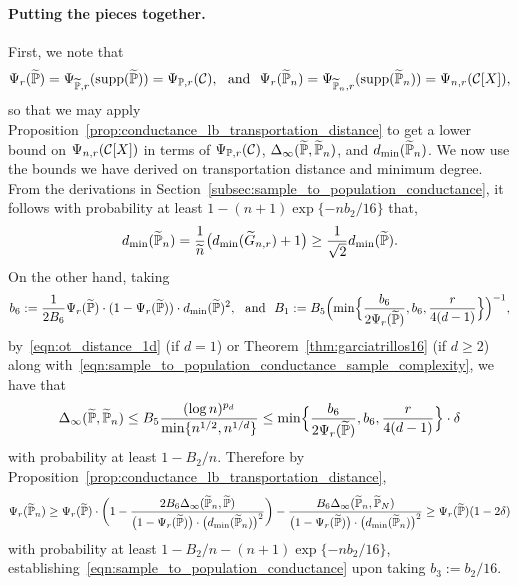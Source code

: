 \paragraph{Putting the pieces together.} 
First, we note that
\begin{equation*}
\Psi_r(\widetilde{\mathbb{P}}) = \Psi_{\widetilde{\mathbb{P}},r}(\mathrm{supp}(\widetilde{\mathbb{P}})) = \Psi_{\mathbb{P},r}(\mathcal{C}), ~~\textrm{and}~~\Psi_{r}(\widetilde{\mathbb{P}}_n) = \Psi_{\widetilde{\mathbb{P}}_n, r}(\mathrm{supp}(\widetilde{\mathbb{P}}_n)) = \Psi_{n,r}(\mathcal{C}[X]),
\end{equation*}
so that we may apply Proposition~\ref{prop:conductance_lb_transportation_distance} to get a lower bound on $\Psi_{n,r}(\mathcal{C}[X])$ in terms of $\Psi_{\mathbb{P},r}(\mathcal{C})$, $\Delta_{\infty}(\widetilde{\mathbb{P}}, \widetilde{\mathbb{P}}_n)$, and $d_{\min}(\widetilde{\mathbb{P}}_{n})$. We now use the bounds we have derived on transportation distance and minimum degree. From the derivations in Section~\ref{subsec:sample_to_population_conductance}, it follows with probability at least $1 - (n + 1)\exp\{-nb_2/16\}$ that,
\begin{equation*}
d_{\min}(\widetilde{\mathbb{P}}_n) = \frac{1}{\widetilde{n}} \bigl(d_{\min}(\widetilde{G}_{n,r}) + 1\bigr) \geq \frac{1}{\sqrt{2}} d_{\min}(\widetilde{\mathbb{P}}).
\end{equation*}
On the other hand, taking
\begin{equation*}
b_6 := \frac{1}{2B_6}\Psi_r(\widetilde{\mathbb{P}}) \cdot (1 - \Psi_r(\widetilde{\mathbb{P}})) \cdot d_{\min}(\widetilde{\mathbb{P}})^2,~~\textrm{and}~~ B_1 := B_5 \Bigl(\min\Bigl\{\frac{b_6}{2\Psi_r(\widetilde{\mathbb{P}})}, b_6, \frac{r}{4(d - 1)} \Bigr\}\Bigr)^{-1},
\end{equation*}
by~\eqref{eqn:ot_distance_1d} (if $d = 1$) or Theorem~\ref{thm:garciatrillos16} (if $d \geq 2$) along with~\eqref{eqn:sample_to_population_conductance_sample_complexity}, we have that
\begin{equation*}
\Delta_{\infty}(\widetilde{\mathbb{P}},\widetilde{\mathbb{P}}_n) \leq B_5 \frac{(\log n)^{p_d}}{\min\{n^{1/2},n^{1/d}\}} \leq \min\Bigl\{\frac{b_6}{2\Psi_r(\widetilde{\mathbb{P}})}, b_6, \frac{r}{4(d - 1)} \Bigr\} \cdot \delta
\end{equation*}
with probability at least $1 - B_2/n$. Therefore by Proposition~\ref{prop:conductance_lb_transportation_distance},
\begin{equation*}
\Psi_r(\widetilde{\mathbb{P}}_n) \geq \Psi_r(\widetilde{\mathbb{P}}) \cdot \biggl(1 - \frac{2B_6\Delta_{\infty}(\widetilde{\mathbb{P}}_n,\widetilde{\mathbb{P}})}{\bigl(1 - \Psi_r(\widetilde{\mathbb{P}})\bigr) \cdot \bigl(d_{\min}(\widetilde{\mathbb{P}}_n)\bigr)^2}\biggr) - \frac{B_6 \Delta_{\infty}(\widetilde{\mathbb{P}}_n,\widetilde{\mathbb{P}}_N)}{\bigl(1 - \Psi_r(\widetilde{\mathbb{P}})\bigr) \cdot \bigl(d_{\min}(\widetilde{\mathbb{P}}_n)\bigr)^2} \geq \Psi_r(\widetilde{\mathbb{P}}) (1 - 2\delta)
\end{equation*}
with probability at least $1 - B_2/n - (n + 1)\exp\{-nb_2/16\}$, establishing~\eqref{eqn:sample_to_population_conductance} upon taking $b_3 := b_2/16$.

